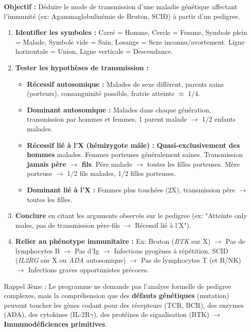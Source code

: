 \documentclass[11pt]{article}
\newcommand{\cle}[1]{{\popxbold\color{popdark}#1}}
\begin{document}
\begin{methode}
\textbf{Objectif :} Déduire le mode de transmission d'une maladie génétique affectant l'immunité (ex: Agammaglobulinémie de Bruton, SCID) à partir d'un pedigree.
\begin{enumerate}
 \item \textbf{Identifier les symboles :} Carré = Homme, Cercle = Femme, Symbole plein = Malade, Symbole vide = Sain, Losange = Sexe inconnu/avortement. Ligne horizontale = Union, Ligne verticale = Descendance.
 \item \textbf{Tester les hypothèses de transmission :}
 \begin{itemize}
 \item \textbf{Récessif autosomique :} Malades de sexe différent, parents sains (porteurs), consanguinité possible, fratrie atteinte $\approx$ 1/4.
 \item \textbf{Dominant autosomique :} Malades dans chaque génération, transmission par hommes et femmes, 1 parent malade $\rightarrow$ 1/2 enfants malades.
 \item \textbf{Récessif lié à l'X (hémizygote mâle) :} \textbf{Quasi-exclusivement des hommes} malades. Femmes porteuses généralement saines. Transmission \textbf{jamais père $\rightarrow$ fils}. Père malade $\rightarrow$ toutes les filles porteuses. Mère porteuse $\rightarrow$ 1/2 fils malades, 1/2 filles porteuses.
 \item \textbf{Dominant lié à l'X :} Femmes plus touchées (2X), transmission père $\rightarrow$ toutes les filles.
 \end{itemize}
 \item \textbf{Conclure} en citant les arguments observés sur le pedigree (ex: "Atteinte only males, pas de transmission père-fils $\rightarrow$ Récessif lié à l'X").
 \item \textbf{Relier au phénotype immunitaire :} Ex: Bruton (\textit{BTK} sur X) $\rightarrow$ Pas de lymphocytes B $\rightarrow$ Pas d'Ig $\rightarrow$ Infections pyogènes à répétition. SCID (\textit{IL2RG} sur X ou \textit{ADA} autosomique) $\rightarrow$ Pas de lymphocytes T (et B/NK) $\rightarrow$ Infections graves opportunistes précoces.
\end{enumerate}
\cle{Rappel 3ème :} Le programme ne demande pas l'analyse formelle de pedigree complexes, mais la compréhension que des \textbf{défauts génétiques} (mutation) peuvent toucher les gènes codant pour des récepteurs (TCR, BCR), des enzymes (ADA), des cytokines (IL-2R$\gamma$), des protéines de signalisation (BTK) $\rightarrow$ \textbf{Immunodéficiences primitives}.
\end{methode}
\end{document}
